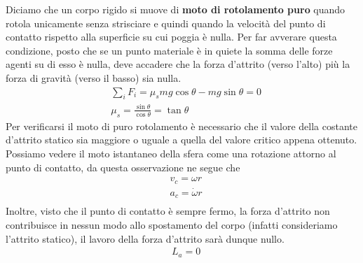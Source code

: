 Diciamo che un corpo rigido si muove di \textbf{moto di rotolamento puro} quando rotola unicamente senza strisciare e quindi quando la velocità del punto di contatto rispetto alla superficie su cui poggia è nulla. Per far avverare questa condizione, posto che se un punto materiale è in quiete la somma delle forze agenti su di esso è nulla, deve accadere che la forza d'attrito (verso l'alto) più la forza di gravità (verso il basso) sia nulla. 
\begin{align*}
	&\sum_i {F_i} = \mu_s mg \cos \theta - mg \sin \theta = 0\\
	&\mu_s = \frac{\sin\theta}{\cos\theta}=\tan\theta
\end{align*}
Per verificarsi il moto di puro rotolamento è necessario che il valore della costante d'attrito statico sia maggiore o uguale a quella del valore critico appena ottenuto.\\
Possiamo vedere il moto istantaneo della sfera come una rotazione attorno al punto di contatto, da questa  osservazione ne segue che 
\begin{align*}
	&v_c = \omega r\\
	&a_c = \dot{\omega} r\\
\end{align*}
Inoltre, visto che il punto di contatto è sempre fermo, la forza d'attrito non contribuisce in nessun modo allo spostamento del corpo (infatti consideriamo l'attrito statico), il lavoro della forza d'attrito sarà dunque nullo.
\begin{align*}
	&L_a = 0
\end{align*}
